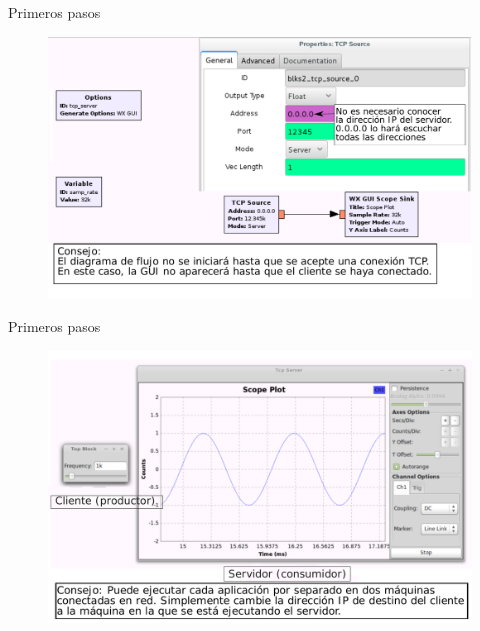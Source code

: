 \begin{frame}{Primeros pasos}
\begin{figure}[H]
\centering
\includegraphics[width=\textwidth]{lab1/pdf/lab126.pdf}
\end{figure}
\end{frame}

\begin{frame}{Primeros pasos}
\begin{figure}[H]
\centering
\includegraphics[width=\textwidth, height=0.55\textwidth]{lab1/pdf/lab127.pdf}
\end{figure}
\end{frame}


